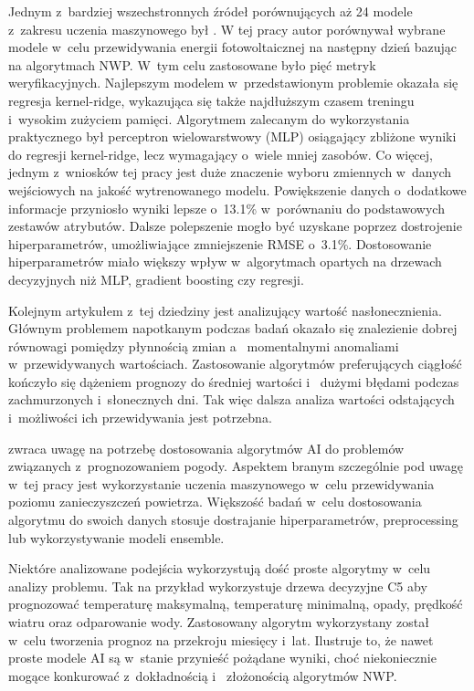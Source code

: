 Jednym z~bardziej wszechstronnych źródeł porównujących aż 24 modele z~zakresu
uczenia maszynowego był \cite{comparison-of-ml-methods}.
W tej pracy autor porównywał wybrane modele w~celu przewidywania energii fotowoltaicznej
na następny dzień bazując na algorytmach NWP. W~tym celu zastosowane było pięć metryk
weryfikacyjnych. Najlepszym modelem w~przedstawionym problemie okazała się regresja 
kernel-ridge, wykazująca się także najdłuższym czasem treningu i~wysokim zużyciem pamięci.
Algorytmem zalecanym do wykorzystania praktycznego był perceptron wielowarstwowy (MLP)
osiągający zbliżone wyniki do regresji kernel-ridge, lecz wymagający o~wiele mniej zasobów.
Co więcej, jednym z~wniosków tej pracy jest duże znaczenie wyboru zmiennych w~danych wejściowych
na jakość wytrenowanego modelu. Powiększenie danych o~dodatkowe informacje przyniosło
wyniki lepsze o~13.1\% w~porównaniu do podstawowych zestawów atrybutów. Dalsze polepszenie
mogło być uzyskane poprzez dostrojenie hiperparametrów, umożliwiające zmniejszenie 
RMSE o~3.1\%. Dostosowanie hiperparametrów miało większy wpływ w~algorytmach opartych
na drzewach decyzyjnych niż MLP, gradient boosting czy regresji. 

Kolejnym artykułem z~tej dziedziny jest \cite{coupling-data-science}
analizujący wartość nasłonecznienia. Głównym problemem napotkanym podczas
badań okazało się znalezienie dobrej równowagi pomiędzy płynnością zmian a~
momentalnymi anomaliami w~przewidywanych wartościach. Zastosowanie algorytmów
preferujących ciągłość kończyło się dążeniem prognozy do średniej wartości i~
dużymi błędami podczas zachmurzonych i~słonecznych dni. Tak więc dalsza analiza 
wartości odstających i~możliwości ich przewidywania jest potrzebna.

\cite{development-and-application-of-ml-in}
zwraca uwagę na potrzebę dostosowania algorytmów AI do problemów związanych z~prognozowaniem
pogody. Aspektem branym szczególnie pod uwagę w~tej pracy jest wykorzystanie uczenia
maszynowego w~celu przewidywania poziomu zanieczyszczeń powietrza. Większość
badań w~celu dostosowania algorytmu do swoich danych stosuje dostrajanie hiperparametrów,
preprocessing lub wykorzystywanie modeli ensemble. 

Niektóre analizowane podejścia wykorzystują dość proste algorytmy w~celu analizy
problemu. Tak na przykład 
\cite{weather-forecast-prediction-data-mining} wykorzystuje drzewa decyzyjne C5 
aby prognozować temperaturę maksymalną, temperaturę minimalną, opady, prędkość wiatru
oraz odparowanie wody. Zastosowany algorytm wykorzystany został w~celu tworzenia prognoz
na przekroju miesięcy i~lat. Ilustruje to, że nawet proste modele AI są w~stanie 
przynieść pożądane wyniki, choć niekoniecznie mogące konkurować z~dokładnością i~
złożonością algorytmów NWP.

